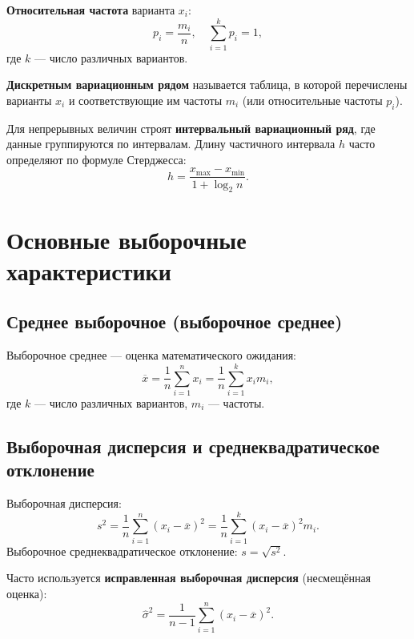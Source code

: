 \documentclass[10pt]{article}
\begin{document}
\begin{definition}
\textbf{Относительная частота} варианта $x_i$:
\[
p_i = \frac{m_i}{n}, \quad \sum_{i=1}^{k} p_i = 1,
\]
где $k$ — число различных вариантов.
\end{definition}

\begin{definition}
\textbf{Дискретным вариационным рядом} называется таблица, в которой перечислены варианты $x_i$ и соответствующие им частоты $m_i$ (или относительные частоты $p_i$).
\end{definition}

Для непрерывных величин строят \textbf{интервальный вариационный ряд}, где данные группируются по интервалам. Длину частичного интервала $h$ часто определяют по формуле Стерджесса:
\[
h = \frac{x_{\max} - x_{\min}}{1 + \log_2 n}.
\]

\section{Основные выборочные характеристики}

\subsection{Среднее выборочное (выборочное среднее)}
\begin{definition}
Выборочное среднее — оценка математического ожидания:
\[
\overline{x} = \frac{1}{n} \sum_{i=1}^{n} x_i = \frac{1}{n} \sum_{i=1}^{k} x_i m_i,
\]
где $k$ — число различных вариантов, $m_i$ — частоты.
\end{definition}

\subsection{Выборочная дисперсия и среднеквадратическое отклонение}
\begin{definition}
Выборочная дисперсия:
\[
s^2 = \frac{1}{n} \sum_{i=1}^{n} (x_i - \overline{x})^2 = \frac{1}{n} \sum_{i=1}^{k} (x_i - \overline{x})^2 m_i.
\]
Выборочное среднеквадратическое отклонение: $s = \sqrt{s^2}$.
\end{definition}

Часто используется \textbf{исправленная выборочная дисперсия} (несмещённая оценка):
\[
\hat{\sigma}^2 = \frac{1}{n-1} \sum_{i=1}^{n} (x_i - \overline{x})^2.
\]
\end{document}
